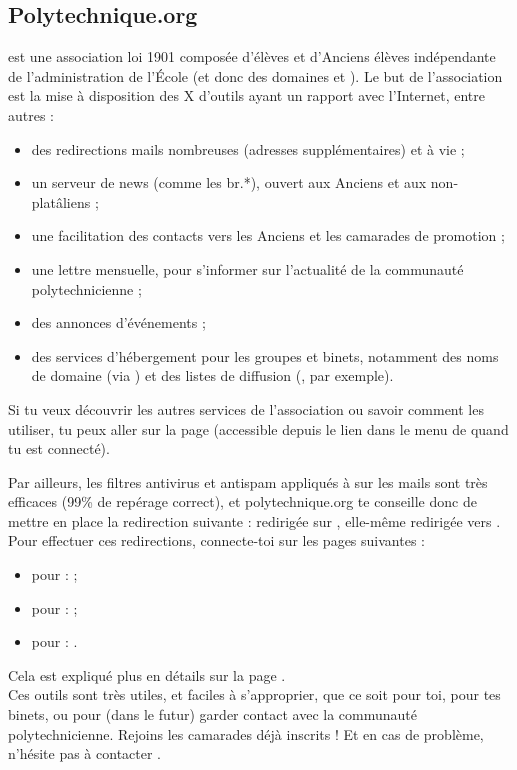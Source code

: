 \subsection{Polytechnique.org}
 est une association loi 1901 composée d'élèves et d'Anciens élèves
 indépendante de l'administration de l'\'Ecole (et donc des domaines 
 et ). Le but de l'association est la mise à disposition des X d'outils
ayant un rapport avec l'Internet, entre autres :
\begin{itemize}
  \item des redirections mails nombreuses (adresses supplémentaires) et à vie ;
  \item un serveur de news (comme les br.*), ouvert aux Anciens et aux non-platâliens ;
  \item une facilitation des contacts vers les Anciens et les camarades de promotion ;
  \item une lettre mensuelle, pour s'informer sur l'actualité de la communauté polytechnicienne ;
  \item des annonces d'événements ;
  \item des services d'hébergement pour les groupes et binets, notamment des noms de domaine (via ) et des listes de diffusion (, par exemple).
\end{itemize}
Si tu veux découvrir les autres services de l'association ou savoir
comment les utiliser, tu peux aller sur la page
 (accessible depuis
le lien  dans le menu de 
quand tu est connecté).

Par ailleurs, les filtres antivirus et antispam appliqués à sur les mails sont très efficaces (99\% de repérage correct), et polytechnique.org te conseille donc de mettre en place la redirection suivante :
redirigée sur ,
elle-même redirigée vers .
Pour effectuer ces redirections, connecte-toi sur les pages suivantes :
\begin{itemize}
  \item pour  :  ;
  \item pour  :  ;
  \item pour  : .
\end{itemize}
Cela est expliqué plus en détails sur la page
. \\
%
\nopagebreak
%
\indent Ces outils sont très utiles, et faciles à s'approprier, que
ce soit pour toi, pour tes binets, ou pour (dans le
futur) garder contact avec la communauté polytechnicienne. Rejoins
les  camarades déjà inscrits ! Et en cas de problème, n'hésite pas à contacter
.
